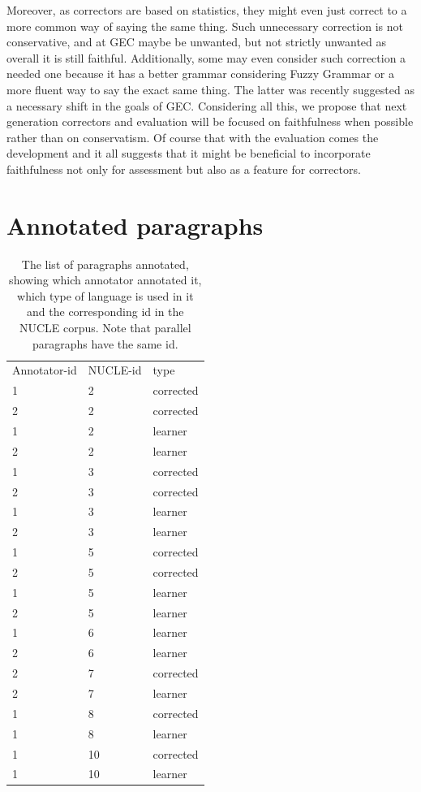 \documentclass[letter,11pt]{article}
\begin{document}
		Moreover, as correctors are based on statistics, they might even
		just correct to a more common way of saying the same thing. Such unnecessary
		correction is not conservative, and at GEC maybe be unwanted, but not strictly unwanted as overall
		it is still faithful. Additionally, some may even
		consider such correction a needed one because it has a better grammar considering
		Fuzzy Grammar\cite{lakoff1973fuzzy,madnani2011they} or a more fluent
		way to say the exact same thing. The latter was recently suggested as a necessary
		shift in the goals of GEC\cite{sakaguchi2016reassessing}.
		Considering all this, we propose that next generation correctors and evaluation will be focused on faithfulness
		when possible rather than on conservatism. Of course that with the evaluation comes the development and it all suggests that it might be beneficial to incorporate faithfulness not only for assessment but also as a feature for correctors. 
		
		
		
		
		\appendix
		\section{Annotated paragraphs}
		\begin{table}[]
			\centering
			\begin{tabular}{lll}
				Annotator-id & NUCLE-id & type      \\
				1         & 2  & corrected \\
				2         & 2  & corrected \\
				1         & 2  & learner   \\
				2         & 2  & learner   \\
				1         & 3  & corrected \\
				2         & 3  & corrected \\
				1         & 3  & learner   \\
				2         & 3  & learner   \\
				1         & 5  & corrected \\
				2         & 5  & corrected \\
				1         & 5  & learner   \\
				2         & 5  & learner   \\
				1         & 6  & learner   \\
				2         & 6  & learner   \\
				2         & 7  & corrected \\
				2         & 7  & learner   \\
				1         & 8  & corrected \\
				1         & 8  & learner   \\
				1         & 10 & corrected \\
				1         & 10 & learner  
			\end{tabular}
			\caption{The list of paragraphs annotated, showing which annotator annotated it, which type of language is used in it and the corresponding id in the NUCLE corpus. Note that parallel paragraphs have the same id.\label{tab:annotated-paragraphs}}
		\end{table}
	
\end{document}
